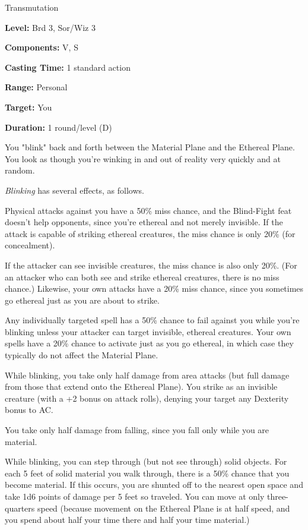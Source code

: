 
Transmutation

\textbf{Level:} Brd 3, Sor/Wiz 3

\textbf{Components:} V, S

\textbf{Casting Time:} 1 standard action

\textbf{Range:} Personal

\textbf{Target:} You

\textbf{Duration:} 1 round/level (D)

You "blink" back and forth between the Material Plane and the Ethereal Plane. 
You look as though you're winking in and out of reality very quickly and at random.

\textit{Blinking} has several effects, as follows.

Physical attacks against you have a 50\% miss chance, and the Blind-Fight feat 
doesn't help opponents, since you're ethereal and not merely invisible. If the 
attack is capable of striking ethereal creatures, the miss chance is only 20\% 
(for concealment).

If the attacker can see invisible creatures, the miss chance is also only 20\%. 
(For an attacker who can both see and strike ethereal creatures, there is no miss 
chance.) Likewise, your own attacks have a 20\% miss chance, since you sometimes 
go ethereal just as you are about to strike.

Any individually targeted spell has a 50\% chance to fail against you while you're 
blinking unless your attacker can target invisible, ethereal creatures. 
Your own spells have a 20\% chance to activate just as you go ethereal, in which 
case they typically do not affect the Material Plane.

While blinking, you take only half damage from area attacks (but full 
damage from those that extend onto the Ethereal Plane). You strike as an invisible 
creature (with a +2 bonus on attack rolls), denying your target any Dexterity bonus 
to AC.

You take only half damage from falling, since you fall only while you are material.

While blinking, you can step through (but not see through) solid objects. 
For each 5 feet of solid material you walk through, there is a 50\% chance that 
you become material. If this occurs, you are shunted off to the nearest open space 
and take 1d6 points of damage per 5 feet so traveled. You can move at only three-quarters 
speed (because movement on the Ethereal Plane is at half speed, and you spend about 
half your time there and half your time material.)

